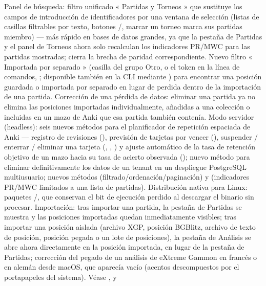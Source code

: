\documentclass[letterpaper,10pt,spanish]{sphinxmanual}
\begin{document}
\begin{savenotes}
\begin{longtable}{}
\begin{varwidth}[t]{}
Panel de búsqueda: filtro unificado « Partidas y Torneos » que sustituye los campos de introducción de identificadores por una ventana de selección (listas de casillas filtrables por texto, botones /, marcar un torneo marca sus partidas miembro) — más rápido en bases de datos grandes, ya que la pestaña de Partidas y el panel de Torneos ahora solo recalculan los indicadores PR/MWC para las partidas mostradas;  cierra la brecha de paridad correspondiente. Nuevo filtro « Importada por separado » (casilla del grupo Otro, o el token  en la línea de comandos, ; disponible también en la CLI mediante ) para encontrar una posición guardada o importada por separado en lugar de perdida dentro de la importación de una partida. Corrección de una pérdida de datos: eliminar una partida ya no elimina las posiciones importadas individualmente, añadidas a una colección o incluidas en un mazo de Anki que esa partida también contenía. Modo servidor (headless): seis nuevos métodos para el planificador de repetición espaciada de Anki — registro de revisiones (), previsión de tarjetas por vencer (), suspender / enterrar / eliminar una tarjeta (, , ) y ajuste automático de la tasa de retención objetivo de un mazo hacia su tasa de acierto observada (); nuevo método  para eliminar definitivamente los datos de un tenant en un despliegue PostgreSQL multiusuario; nuevos métodos  (filtrado/ordenación/paginación) y  (indicadores PR/MWC limitados a una lista de partidas). Distribución nativa para Linux: paquetes /, que conservan el bit de ejecución perdido al descargar el binario sin procesar. Importación: tras importar una partida, la pestaña de Partidas se muestra y las posiciones importadas quedan inmediatamente visibles; tras importar una posición aislada (archivo XGP, posición BGBlitz, archivo de texto de posición, posición pegada o un lote de posiciones), la pestaña de Análisis se abre ahora directamente en la posición importada, en lugar de la pestaña de Partidas; corrección del pegado de un análisis de eXtreme Gammon en francés o en alemán desde macOS, que aparecía vacío (acentos descompuestos por el portapapeles del sistema). Véase {\hyperref[\detokenize{mode_headless:headless}]{}}, {\hyperref[\detokenize{cmd_mode:cmd-mode}]{}} y 
\end{varwidth}
\end{longtable}
\end{savenotes}
\end{document}
